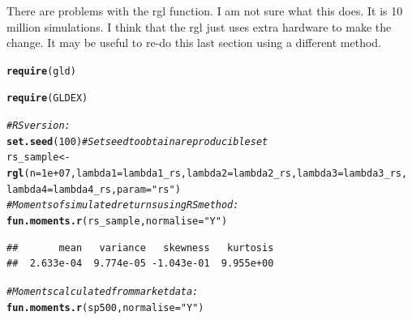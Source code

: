 \documentclass[12pt, a4paper, oneside]{article}\usepackage[]{graphicx}\usepackage[]{color}
\makeatletter
\newcommand{\hlnum}[1]{\textcolor[rgb]{0.686,0.059,0.569}{#1}}%
\newcommand{\hlstr}[1]{\textcolor[rgb]{0.192,0.494,0.8}{#1}}%
\newcommand{\hlcom}[1]{\textcolor[rgb]{0.678,0.584,0.686}{\textit{#1}}}%
\newcommand{\hlstd}[1]{\textcolor[rgb]{0.345,0.345,0.345}{#1}}%
\newcommand{\hlkwb}[1]{\textcolor[rgb]{0.69,0.353,0.396}{#1}}%
\newcommand{\hlkwc}[1]{\textcolor[rgb]{0.333,0.667,0.333}{#1}}%
\newcommand{\hlkwd}[1]{\textcolor[rgb]{0.737,0.353,0.396}{\textbf{#1}}}%
\newenvironment{kframe}{%
 \def\at@end@of@kframe{}%
 \ifinner\ifhmode%
  \def\at@end@of@kframe{\end{minipage}}%
  \begin{minipage}{\columnwidth}%
 \fi\fi%
 \def\FrameCommand##1{\hskip\@totalleftmargin \hskip-\fboxsep
 \colorbox{shadecolor}{##1}\hskip-\fboxsep
     \hskip-\linewidth \hskip-\@totalleftmargin \hskip\columnwidth}%
 \MakeFramed {\advance\hsize-\width
   \@totalleftmargin\z@ \linewidth\hsize
   \@setminipage}}%
 {\par\unskip\endMakeFramed%
 \at@end@of@kframe}
\newenvironment{knitrout}{}{} %
\makeatother
\begin{document}
There are problems with the rgl function.  I am not sure what this does.  It is 10 million simulations.  I think that the rgl just uses extra hardware to make the change. It may be useful to re-do this last section using a different method. 
\begin{knitrout}
\color{fgcolor}\begin{kframe}
\begin{alltt}
\hlkwd{require}\hlstd{(gld)}
\end{alltt}


{\ttfamily\noindent\itshape\color{messagecolor}{\#\# Loading required package: gld}}\begin{alltt}
\hlkwd{require}\hlstd{(GLDEX)}
\end{alltt}


{\ttfamily\noindent\itshape\color{messagecolor}{\#\# Loading required package: GLDEX\\\#\# Loading required package: cluster\\\#\# \\\#\# Attaching package: 'GLDEX'\\\#\# \\\#\# The following objects are masked from 'package:gld':\\\#\# \\\#\#\ \ \ \  dgl, pgl, qdgl, qgl, rgl, starship, starship.adaptivegrid,\\\#\#\ \ \ \  starship.obj}}\begin{alltt}
\hlcom{# RS version:}
\hlkwd{set.seed}\hlstd{(}\hlnum{100}\hlstd{)}  \hlcom{# Set seed to obtain a reproducible set}
\hlstd{rs_sample} \hlkwb{<-} \hlkwd{rgl}\hlstd{(}\hlkwc{n} \hlstd{=} \hlnum{1e+07}\hlstd{,} \hlkwc{lambda1} \hlstd{= lambda1_rs,} \hlkwc{lambda2} \hlstd{= lambda2_rs,} \hlkwc{lambda3} \hlstd{= lambda3_rs,}
    \hlkwc{lambda4} \hlstd{= lambda4_rs,} \hlkwc{param} \hlstd{=} \hlstr{"rs"}\hlstd{)}
\hlcom{# Moments of simulated returns using RS method:}
\hlkwd{fun.moments.r}\hlstd{(rs_sample,} \hlkwc{normalise} \hlstd{=} \hlstr{"Y"}\hlstd{)}
\end{alltt}
\begin{verbatim}
##       mean   variance   skewness   kurtosis 
##  2.633e-04  9.774e-05 -1.043e-01  9.955e+00
\end{verbatim}
\begin{alltt}
\hlcom{# Moments calculated from market data:}
\hlkwd{fun.moments.r}\hlstd{(sp500,} \hlkwc{normalise} \hlstd{=} \hlstr{"Y"}\hlstd{)}
\end{alltt}

\end{kframe}
\end{knitrout}
\end{document}
